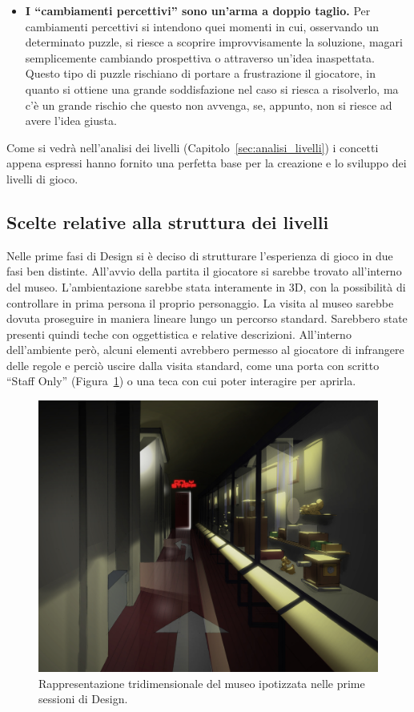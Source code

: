 \begin{itemize}
	\item \textbf{I “cambiamenti percettivi” sono un’arma a doppio taglio.} Per cambiamenti percettivi si intendono quei momenti in cui, osservando un determinato puzzle, si riesce a scoprire improvvisamente la soluzione, magari semplicemente cambiando prospettiva o attraverso un’idea inaspettata. Questo tipo di puzzle rischiano di portare a frustrazione il giocatore, in quanto si ottiene una grande soddisfazione nel caso si riesca a risolverlo, ma c’è un grande rischio che questo non avvenga, se, appunto, non si riesce ad avere l’idea giusta.
\end{itemize}

Come si vedrà nell’analisi dei livelli (Capitolo~\ref{sec:analisi_livelli}) i concetti appena espressi hanno fornito una perfetta base per la creazione e lo sviluppo dei livelli di gioco.

\subsection{Scelte relative alla struttura dei livelli}
\label{sec:struttura_livelli}

Nelle prime fasi di Design si è deciso di strutturare l’esperienza di gioco in due fasi ben distinte. All’avvio della partita il giocatore si sarebbe trovato all’interno del museo. L’ambientazione sarebbe stata interamente in 3D, con la possibilità di controllare in prima persona il proprio personaggio. La visita al museo sarebbe dovuta proseguire in maniera lineare lungo un percorso standard. Sarebbero state presenti quindi teche con oggettistica e relative descrizioni.
All’interno dell’ambiente però, alcuni elementi avrebbero permesso al giocatore di infrangere delle regole e perciò uscire dalla visita standard, come una porta con scritto “Staff Only” (Figura~\ref{fig:level_design_staffonly}) o una teca con cui poter interagire per aprirla.

\begin{figure}%
	\centering
	\includegraphics[width= 0.8\columnwidth]{images/gameDesign/37_museo3d.jpg}
	\caption{Rappresentazione tridimensionale del museo ipotizzata nelle prime sessioni di Design.}
	\label{fig:level_design_staffonly}
\end{figure}

